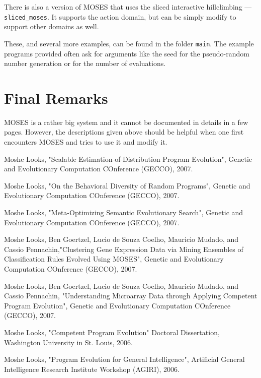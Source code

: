 \documentclass{article}
\begin{document}
There is also a version of MOSES that uses the sliced interactive
hillclimbing --- \verb|sliced_moses|. It supports the action domain,
but can be simply modify to support other domains as well.

These, and several more examples, can be found in the folder \verb|main|.
The example programs provided often ask for arguments like the seed for
the pseudo-random number generation or for the number of evaluations.



\section{Final Remarks}

MOSES is a rather big system and it cannot be documented in details
in a few pages. However, the descriptions given above should be 
helpful when one first encounters MOSES and tries to use it and 
modify it. 



\begin{thebibliography}{10}

Moshe Looks, "Scalable Estimation-of-Distribution Program Evolution",
Genetic and Evolutionary Computation COnference (GECCO), 2007.

Moshe Looks, "On the Behavioral Diversity of Random Programs", Genetic and
Evolutionary Computation COnference (GECCO), 2007.

Moshe Looks, "Meta-Optimizing Semantic Evolutionary Search", Genetic and
Evolutionary Computation COnference (GECCO), 2007.

Moshe Looks, Ben Goertzel, Lucio de Souza Coelho, Mauricio Mudado, and
Cassio Pennachin,"Clustering Gene Expression Data via Mining Ensembles of
Classification Rules Evolved Using MOSES", Genetic and Evolutionary
Computation COnference (GECCO), 2007.

Moshe Looks, Ben Goertzel, Lucio de Souza Coelho, Mauricio Mudado, and
Cassio Pennachin, "Understanding Microarray Data through Applying Competent
Program Evolution", Genetic and Evolutionary Computation COnference (GECCO),
2007.

Moshe Looks, "Competent Program Evolution" Doctoral Dissertation, Washington
University in St. Louis, 2006.

Moshe Looks, "Program Evolution for General Intelligence", Artificial
General Intelligence Research Institute Workshop (AGIRI), 2006.
\end{thebibliography}
\end{document}
